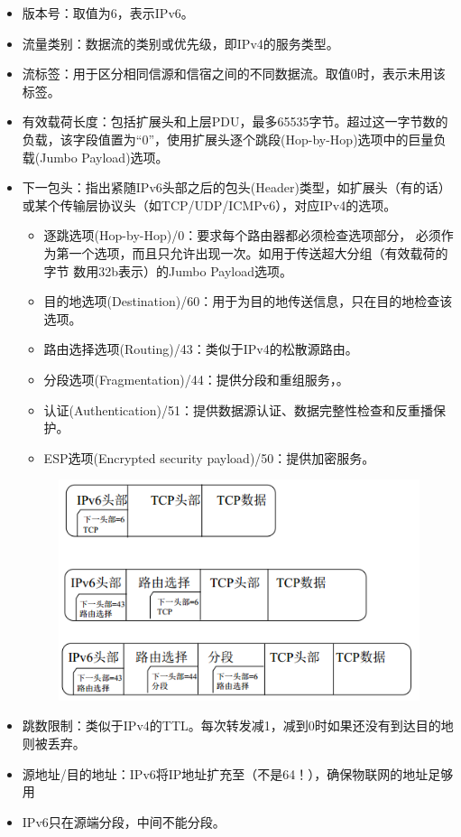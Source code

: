 \begin{itemize}
	\item 版本号：取值为6，表示IPv6。
	\item 流量类别：数据流的类别或优先级，即IPv4的服务类型。
	\item 流标签：用于区分相同信源和信宿之间的不同数据流。取值0时，表示未用该标签。
	\item 有效载荷长度：包括扩展头和上层PDU，最多65535字节。超过这一字节数的负载，该字段值置为“0”，使用扩展头逐个跳段(Hop-by-Hop)选项中的巨量负载(Jumbo Payload)选项。
	\item 下一包头：指出紧随IPv6头部之后的包头(Header)类型，如扩展头（有的话）或某个传输层协议头（如TCP/UDP/ICMPv6），对应IPv4的选项。
	\begin{itemize}
		\item 逐跳选项(Hop-by-Hop)/0：要求每个路由器都必须检查选项部分， 必须作为第一个选项，而且只允许出现一次。如用于传送超大分组（有效载荷的字节
		数用32b表示）的Jumbo Payload选项。
		\item 目的地选项(Destination)/60：用于为目的地传送信息，只在目的地检查该选项。
		\item 路由选择选项(Routing)/43：类似于IPv4的松散源路由。
		\item 分段选项(Fragmentation)/44：提供分段和重组服务，。
		\item 认证(Authentication)/51：提供数据源认证、数据完整性检查和反重播保护。
		\item ESP选项(Encrypted security payload)/50：提供加密服务。
	\end{itemize}
	\begin{figure}[H]
		\centering
		\includegraphics[width=0.4\linewidth]{fig/next-header.png}
	\end{figure}
	\item 跳数限制：类似于IPv4的TTL。每次转发减1，减到0时如果还没有到达目的地则被丢弃。
	\item 源地址/目的地址：IPv6将IP地址扩充至（不是64！），确保物联网的地址足够用
	\item IPv6只在源端分段，中间不能分段。
\end{itemize}

